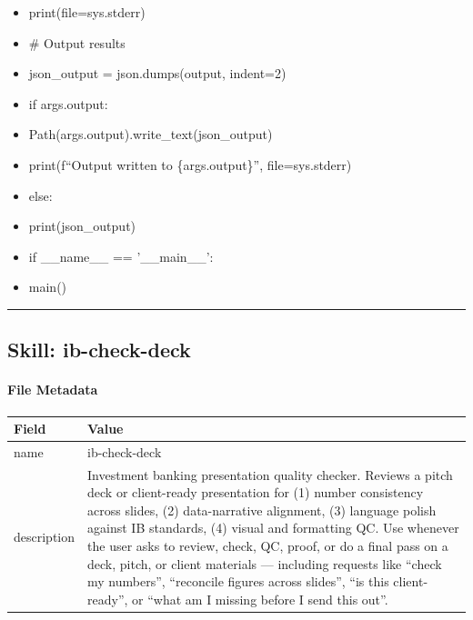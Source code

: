 \documentclass[11pt]{article}
\begin{document}
\begin{itemize}[leftmargin=*,itemsep=2pt,topsep=2pt]
\item {} print(file=sys.stderr)
\item {} \# Output results
\item {} json\_\allowbreak{}output = json.dumps(output, indent=2)
\item {} if args.output:
\item {} Path(args.output).write\_\allowbreak{}text(json\_\allowbreak{}output)
\item {} print(f``Output written to \{args.output\}'', file=sys.stderr)
\item {} else:
\item {} print(json\_\allowbreak{}output)
\item {} if \_\allowbreak{}\_\allowbreak{}name\_\allowbreak{}\_\allowbreak{} == '\_\allowbreak{}\_\allowbreak{}main\_\allowbreak{}\_\allowbreak{}':
\item {} main()
\end{itemize}

\vspace{0.8em}\hrule\vspace{0.8em}

\subsection{Skill: ib-check-deck}\label{file:pitch-agent-skills-ib-check-deck-SKILL-md}

\paragraph{File Metadata}\mbox{}\par
\begingroup
\small
\setlength{\tabcolsep}{2pt}
\begin{longtable}{>{\RaggedRight\arraybackslash\hspace{0pt}}p{}>{\RaggedRight\arraybackslash\hspace{0pt}}p{}}
\toprule
{} \textbf{Field} & \textbf{Value} \\
\midrule
{} name & ib-check-deck \\
{} description & Investment banking presentation quality checker. Reviews a pitch deck or client-ready presentation for (1) number consistency across slides, (2) data-narrative alignment, (3) language polish against IB standards, (4) visual and formatting QC. Use whenever the user asks to review, check, QC, proof, or do a final pass on a deck, pitch, or client materials — including requests like ``check my numbers'', ``reconcile figures across slides'', ``is this client-ready'', or ``what am I missing before I send this out''. \\
\bottomrule
\end{longtable}
\endgroup
\end{document}
